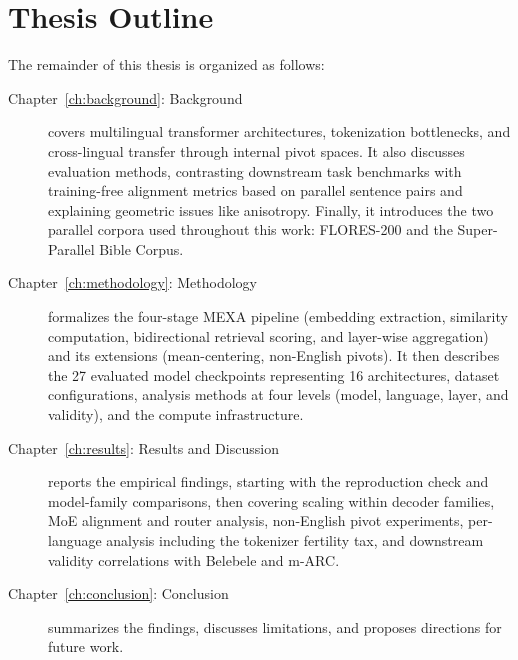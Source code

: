 \section{Thesis Outline}
\label{sec:intro-thesis-outline}

The remainder of this thesis is organized as follows:

\begin{description}
    \item[Chapter~\ref{ch:background}: Background] covers multilingual transformer architectures, tokenization bottlenecks, and cross-lingual transfer through internal pivot spaces. It also discusses evaluation methods, contrasting downstream task benchmarks with training-free alignment metrics based on parallel sentence pairs and explaining geometric issues like anisotropy. Finally, it introduces the two parallel corpora used throughout this work: FLORES-200 and the Super-Parallel Bible Corpus.

    \item[Chapter~\ref{ch:methodology}: Methodology] formalizes the four-stage MEXA pipeline (embedding extraction, similarity computation, bidirectional retrieval scoring, and layer-wise aggregation) and its extensions (mean-centering, non-English pivots). It then describes the 27 evaluated model checkpoints representing 16 architectures, dataset configurations, analysis methods at four levels (model, language, layer, and validity), and the compute infrastructure.

    \item[Chapter~\ref{ch:results}: Results and Discussion] reports the empirical findings, starting with the reproduction check and model-family comparisons, then covering scaling within decoder families, MoE alignment and router analysis, non-English pivot experiments, per-language analysis including the tokenizer fertility tax, and downstream validity correlations with Belebele and m-ARC.

    \item[Chapter~\ref{ch:conclusion}: Conclusion] summarizes the findings, discusses limitations, and proposes directions for future work.
\end{description}
